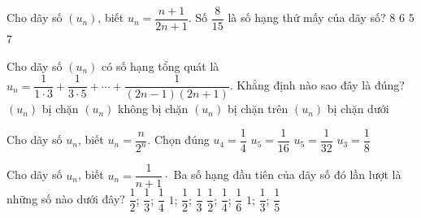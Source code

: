 \begin{ex}%
	Cho dãy số $(u_n)$, biết $u_n=\dfrac{n+1}{2n+1}$. Số $\dfrac{8}{15}$ là số hạng thứ mấy của  dãy số?
	\choice 
		{$8$} 
		{$6$} 
		{$5$} 
		{\True  $7$}
\end{ex}

\begin{ex}%
	Cho dãy số $(u_n)$ có số hạng tổng quát là $u_n = \dfrac{1}{1 \cdot 3} + \dfrac{1}{3 \cdot 5} + \cdots  + \dfrac{1}{(2n - 1)(2n + 1)}$. Khẳng định nào sao đây là đúng?
	 \choice
		{\True $(u_n)$ bị chặn} 
		{$(u_n)$ không bị chặn} 
		{$(u_n)$ bị chặn  trên}
		{$(u_n)$ bị  chặn dưới}
\end{ex}

\begin{ex}%
	Cho dãy số $u_n$, biết $u_n=\dfrac{n}{2^n}$. Chọn đúng 
	\choice 
		{\True  $u_4=\dfrac{1}{4}$}
		 {$u_5=\dfrac{1}{16}$}
		{$u_5=\dfrac{1}{32}$} 
		{$u_3=\dfrac{1}{8}$} 
\end{ex}

\begin{ex}%
	Cho  dãy số $u_n$, biết $u_n=\dfrac{1}{n+1}\cdot$ Ba số hạng đầu tiên của dãy số đó lần lượt là những số nào dưới đây?
	\choice 
		{\True $\dfrac{1}{2}$;  $\dfrac{1}{3}$; $\dfrac{1}{4}$}
		 {$1$; $\dfrac{1}{2}$; $\dfrac{1}{3}$}
		{$\dfrac{1}{2}$; $\dfrac{1}{4}$;  $\dfrac{1}{6}$}
		 {$1$; $\dfrac{1}{3}$; $\dfrac{1}{5}$}
\end{ex}

